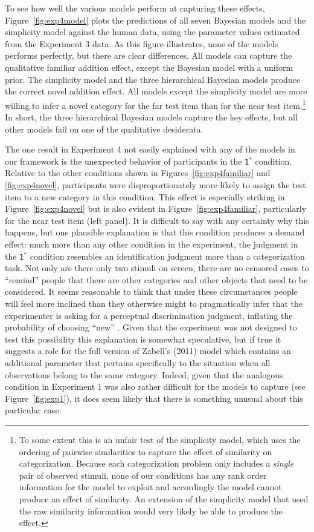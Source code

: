 \documentclass[doc]{apa6}
\newcommand{\dist}[1]{\texttt{#1}}
\begin{document}
To see how well the various models perform at capturing these effects, Figure~\ref{fig:exp4model} plots the predictions of all seven Bayesian models and the simplicity model against the human data, using the parameter values estimated from the Experiment 3 data. As this figure illustrates, none of the models performs perfectly, but there are clear differences. All models can capture the qualitative familiar addition effect, except the Bayesian model with a uniform prior. The simplicity model and the three hierarchical Bayesian models produce the correct novel addition effect. All models except the simplicity model are more willing to infer a novel category for the far test item than for the near test item.\footnote{To some extent this is an unfair test of the simplicity model, which uses the ordering of pairwise similarities to capture the effect of similarity on categorization. Because each categorization problem only includes a {\it single} pair of observed stimuli, none of our conditions has any rank order information for the model to exploit and accordingly the model cannot produce an effect of similarity.  An extension of the simplicity model that used the raw similarity information would very likely be able to produce the effect.} In short, the three hierarchical Bayesian models capture the key effects, but all other models fail on one of the qualitative desiderata.

The one result in Experiment 4 not easily explained with any of the models in our framework is the unexpected behavior of participants in the \dist{1$^*$} condition. Relative to the other conditions shown in Figures~\ref{fig:exp4familiar} and \ref{fig:exp4novel}, participants were disproportionately more likely to assign the test item to a new category in this condition. This effect is especially striking in Figure~\ref{fig:exp4novel} but is also evident in Figure~\ref{fig:exp4familiar}, particularly for the near test item (left panel). It is difficult to say with any certainty why this happens, but one plausible explanation is that this condition produces a demand effect: much more than any other condition in the experiment, the judgment in the \dist{1$^*$} condition resembles an identification judgment more than a categorization task. Not only are there only two stimuli on screen, there are no censored cases to ``remind'' people that there are other categories and other objects that need to be considered. It seems reasonable to think that under these circumstances people will feel more inclined than they otherwise might to pragmatically infer that the experimenter is asking for a perceptual discrimination judgment, inflating the probability of choosing ``new'' \cite{nosofsky_attention_1986}. Given that the experiment was not designed to test this possibility this explanation is somewhat speculative, but if true it suggests a role for the full version of Zabell's (2011) model which contains an additional parameter that pertains specifically to the situation when all observations belong to the same category. Indeed, given that the analogous condition in Experiment 1 was also rather difficult for the models to capture (see Figure~\ref{fig:exp1}), it does seem likely that there is something unusual about this particular case.
\end{document}
